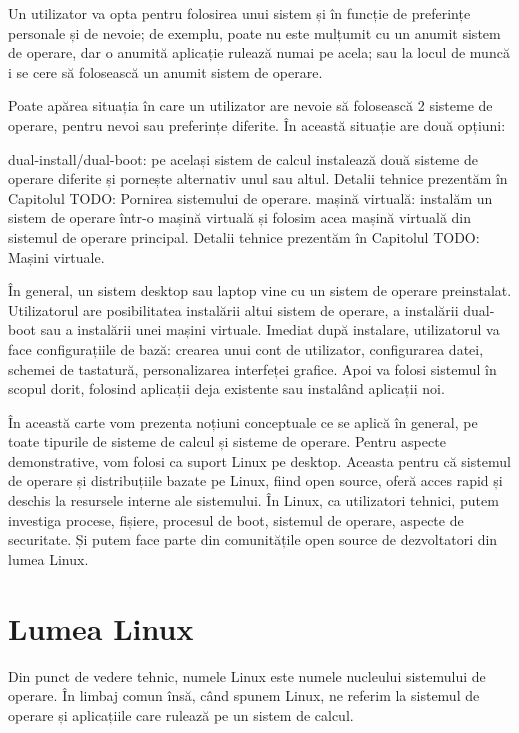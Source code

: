 Un utilizator va opta pentru folosirea unui sistem și în funcție de preferințe personale și de nevoie; de exemplu, poate nu este mulțumit cu un anumit sistem de operare, dar o anumită aplicație rulează numai pe acela; sau la locul de muncă i se cere să folosească un anumit sistem de operare.

Poate apărea situația în care un utilizator are nevoie să folosească 2 sisteme de operare, pentru nevoi sau preferințe diferite. În această situație are două opțiuni:

dual-install/dual-boot: pe același sistem de calcul instalează două sisteme de operare diferite și pornește alternativ unul sau altul. Detalii tehnice prezentăm în Capitolul TODO: Pornirea sistemului de operare.
mașină virtuală: instalăm un sistem de operare într-o mașină virtuală și folosim acea mașină virtuală din sistemul de operare principal. Detalii tehnice prezentăm în Capitolul TODO: Mașini virtuale.

În general, un sistem desktop sau laptop vine cu un sistem de operare preinstalat. Utilizatorul are posibilitatea instalării altui sistem de operare, a instalării dual-boot sau a instalării unei mașini virtuale. Imediat după instalare, utilizatorul va face configurațiile de bază: crearea unui cont de utilizator, configurarea datei, schemei de tastatură, personalizarea interfeței grafice. Apoi va folosi sistemul în scopul dorit, folosind aplicații deja existente sau instalând aplicații noi.

În această carte vom prezenta noțiuni conceptuale ce se aplică în general, pe toate tipurile de sisteme de calcul și sisteme de operare. Pentru aspecte demonstrative, vom folosi ca suport Linux pe desktop. Aceasta pentru că sistemul de operare și distribuțiile bazate pe Linux, fiind open source, oferă acces rapid și deschis la resursele interne ale sistemului. În Linux, ca utilizatori tehnici, putem investiga procese, fișiere, procesul de boot, sistemul de operare, aspecte de securitate. Și putem face parte din comunitățile open source de dezvoltatori din lumea Linux.

\section{Lumea Linux}
\label{sec:intro:linux}

Din punct de vedere tehnic, numele Linux este numele nucleului sistemului de operare. În limbaj comun însă, când spunem Linux, ne referim la sistemul de operare și aplicațiile care rulează pe un sistem de calcul.

